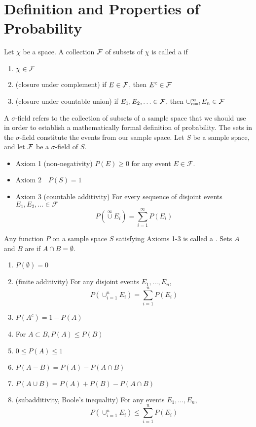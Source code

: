 \documentclass[11pt]{article}
\begin{document}
   \section{Definition and Properties of Probability}
   Let $\chi$ be a space. A collection $\mathcal{F}$ of subsets of $\chi$ is called a  if
   \begin{enumerate}
   	\item $\chi \in \mathcal{F}$
   	\item (closure under complement) if $E \in \mathcal{F}$, then $E^c \in \mathcal{F}$
   	\item (closure under countable union) if $E_1, E_2, \hdots \in \mathcal{F}$, then $\cup_{n=1}^\infty E_n \in \mathcal{F}$
   \end{enumerate}
   \remark A $\sigma$-field refers to the collection of subsets of a sample space that we should use in order to establish a mathematically formal definition of probability. The sets in the $\sigma$-field constitute the events from our sample space.
   Let $S$ be a sample space, and let $\mathcal{F}$ be a $\sigma$-field of $S$.
   \begin{itemize}
   	\item Axiom 1 (non-negativity) \(P(E) \geq 0\) for any event \(E \in \mathcal{F}\).
   	\item Axiom \(2 \quad P(S)=1\)
   	\item Axiom 3 (countable additivity) For every sequence of disjoint events \(E_{1}, E_{2}, \ldots \in \mathcal{F}\)
$$
P\left(\stackrel{\infty}{\cup} E_{i}\right)=\sum_{i=1}^{\infty} P\left(E_{i}\right)
$$
   \end{itemize}
    Any function $P$ on a sample space $S$ satisfying Axioms 1-3 is called a .
    Sets $A$ and $B$ are  if $A \cap B = \emptyset$.
   \begin{enumerate}
   	\item $P(\emptyset) = 0$
   	\item (finite additivity) For any disjoint events $E_1, \hdots, E_n$, $$P(\cup_{i=1}^n E_i) = \sum_{i=1}^n P(E_i)$$
   	\item $P(A^c) = 1 - P(A)$
   	\item For $A \subset B, P(A) \leq P(B)$
   	\item $0 \leq P(A) \leq 1$
   	\item $P(A- B) = P(A) - P(A \cap B)$
   	\item $P(A\cup B) = P(A) + P(B) - P(A \cap B)$
   	\item (subadditivity, Boole's inequality) For any events $E_1, \hdots, E_n$,
   	$$P(\cup_{i=1}^n E_i) \leq \sum_{i=1}^n P(E_i)$$
   \end{enumerate}
\end{document}
